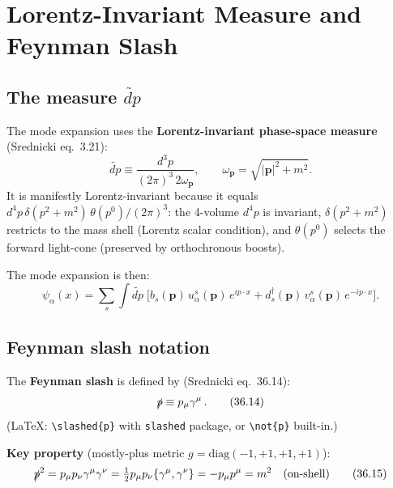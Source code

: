 \documentclass[12pt]{article}
\begin{document}
\section{Lorentz-Invariant Measure and Feynman Slash}

\subsection{The measure \texorpdfstring{$\widetilde{dp}$}{dp-tilde}}

The mode expansion uses the \textbf{Lorentz-invariant phase-space measure}
(Srednicki eq.~3.21):
\begin{equation}
  \widetilde{dp} \equiv \frac{d^3p}{(2\pi)^3\,2\omega_{\mathbf{p}}},
  \qquad \omega_{\mathbf{p}} = \sqrt{|\mathbf{p}|^2 + m^2}.
  \tag{3.21}
\end{equation}
It is manifestly Lorentz-invariant because it equals
$d^4p\,\delta(p^2+m^2)\,\theta(p^0)/(2\pi)^3$:
the 4-volume $d^4p$ is invariant, $\delta(p^2+m^2)$ restricts to the mass shell
(Lorentz scalar condition), and $\theta(p^0)$ selects the forward light-cone
(preserved by orthochronous boosts).

The mode expansion is then:
\begin{equation}
  \psi_\alpha(x) = \sum_s \int\!\widetilde{dp}\;
  \bigl[b_s(\mathbf{p})\,u^s_\alpha(\mathbf{p})\,e^{ip\cdot x}
       + d^\dagger_s(\mathbf{p})\,v^s_\alpha(\mathbf{p})\,e^{-ip\cdot x}\bigr].
\end{equation}

\subsection{Feynman slash notation}

The \textbf{Feynman slash} is defined by (Srednicki eq.~36.14):
\begin{equation}
  \slashed{p} \equiv p_\mu\gamma^\mu\,.
  \tag{36.14}
\end{equation}
(LaTeX: \verb|\slashed{p}| with \texttt{slashed} package, or \verb|\not{p}| built-in.)

\medskip
\textbf{Key property} (mostly-plus metric $g=\mathrm{diag}(-1,+1,+1,+1)$):
\begin{equation}
  \slashed{p}^2 = p_\mu p_\nu \gamma^\mu\gamma^\nu
  = \tfrac{1}{2}p_\mu p_\nu\{\gamma^\mu,\gamma^\nu\}
  = -p_\mu p^\mu = m^2 \quad(\text{on-shell})
  \tag{36.15}
\end{equation}
\end{document}
